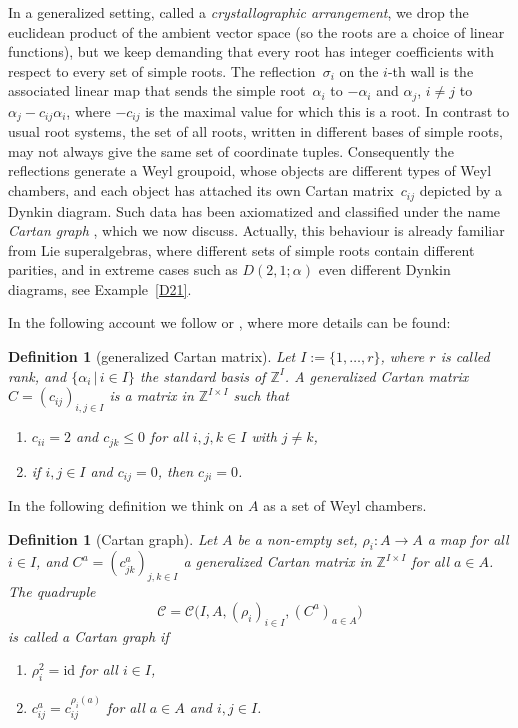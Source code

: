 \documentclass[10pt,a4paper]{amsart}
\numberwithin{equation}{section}
\newtheorem{defin}[teo]{Definition}
\newcommand{\Z}{\mathbb{Z}}
\begin{document}
In a generalized setting, called a \emph{crystallographic arrangement}, we drop the euclidean product of the ambient vector space (so the roots are a choice of linear functions), but we keep demanding that every root has integer coefficients with respect to every set of simple roots. The reflection~$\sigma_i$ on the $i$-th wall is the associated linear map that sends the simple root~$\alpha_i$ to $-\alpha_i$ and $\alpha_j$, $i\neq j$ to $\alpha_j-c_{ij}\alpha_i$, where $-c_{ij}$ is the maximal value for which this is a root. In contrast to usual root systems, the set of all roots, written in different bases of simple roots, may not always give the same set of coordinate tuples. Consequently the reflections generate a Weyl groupoid, whose objects are different types of Weyl chambers, and each object has attached its own Cartan matrix~$c_{ij}$ depicted by a Dynkin diagram. Such data has been axiomatized and classified under the name \emph{Cartan graph} \cite{AHS10, Heck07, HS08, HY08}, which we now discuss.
Actually, this behaviour is already familiar from Lie superalgebras, where different sets of simple roots contain different parities, and in extreme cases such as $D(2,1;\alpha)$ even different Dynkin diagrams, see Example~\ref{D21}.

In the following account we follow \cite[Section~3.2]{Heck07} or \cite[Chapters~9,~10 and~15]{HS20}, where more details can be found:

\newcommand{\ZZ}{\Z}
\newcommand{\Cm}{C}
\newcommand{\cm}{c}
\newcommand{\rfl}{\rho}
\newcommand{\s}{\sigma}
\renewcommand{\r}{\mathrm{r}}
\newcommand{\Cc}{\mathcal{C}}
\newcommand{\Wg}{\mathcal{W}}
\newcommand{\re }{^\mathrm{re}}
\newcommand{\rer }[1]{(R\re)^{#1}}
\newcommand{\rsC }{\mathcal{R}}
\begin{defin}[generalized Cartan matrix]
	Let $I:=\{1,\dots,r\}$, where $r$ is called {\it rank}, and
	$\{\alpha_i\,|\,i\in I\}$ the standard basis of $\ZZ ^I$.
	A {\it generalized Cartan matrix}
	$\Cm =(\cm _{ij})_{i,j\in I}$
	is a matrix in $\ZZ ^{I\times I}$ such that
	\begin{enumerate}\itemsep=0pt
		\item[(M1)] $\cm _{ii}=2$ and $\cm _{jk}\le 0$ for all $i,j,k\in I$ with
		$j\not=k$,
		\item[(M2)] if $i,j\in I$ and $\cm _{ij}=0$, then $\cm _{ji}=0$.
	\end{enumerate}
\end{defin}
In the following definition we think on $A$ as a set of Weyl chambers.
\begin{defin}[Cartan graph]
	Let $A$ be a non-empty set, $\rfl _i\colon A \to A$ a map for all $i\in I$,
	and $\Cm ^a=(\cm ^a_{jk})_{j,k \in I}$ a generalized Cartan matrix
	in $\ZZ ^{I \times I}$ for all $a\in A$. The quadruple
	\[ \Cc = \Cc \big(I,A,(\rfl _i)_{i \in I}, (\Cm ^a)_{a \in A}\big)\]
	is called a \textit{Cartan graph} if
	\begin{enumerate}\itemsep=0pt
		\item[(C1)] $\rfl _i^2 = \mathrm{id}$ for all $i \in I$,
		\item[(C2)] $\cm ^a_{ij} = \cm ^{\rfl _i(a)}_{ij}$ for all $a\in A$ and
		$i,j\in I$.
	\end{enumerate}
\end{defin}
\end{document}
